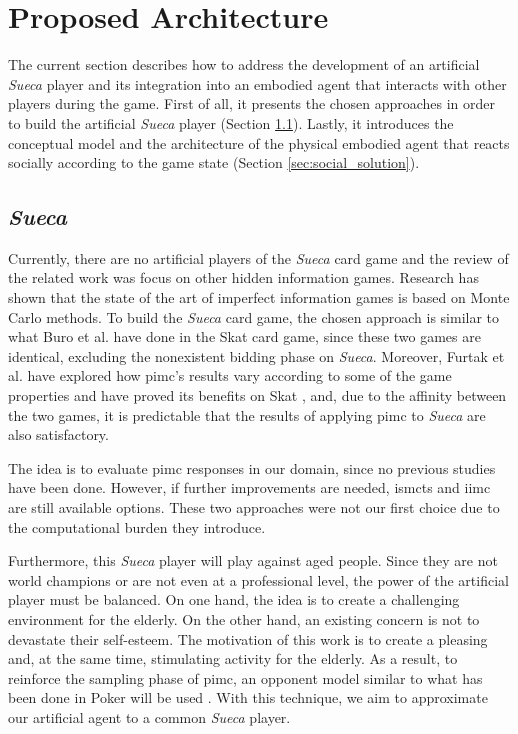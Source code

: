 \section{Proposed Architecture} \label{sec:architecture}

The current section describes how to address the development of an artificial \emph{Sueca} player and its integration into an embodied agent that interacts with other players during the game.
First of all, it presents the chosen approaches in order to build the artificial \emph{Sueca} player (Section \ref{sec:sueca_solution}).
Lastly, it introduces the conceptual model and the architecture of the physical embodied agent that reacts socially according to the game state (Section \ref{sec:social_solution}).


\subsection{\emph{Sueca}}
\label{sec:sueca_solution}

Currently, there are no artificial players of the \emph{Sueca} card game and the review of the related work was focus on other hidden information games.
Research has shown that the state of the art of imperfect information games is based on Monte Carlo methods.
To build the \emph{Sueca} card game, the chosen approach is similar to what Buro et al. have done in the Skat card game, since these two games are identical, excluding the nonexistent bidding phase on \emph{Sueca}.
Moreover, Furtak et al. have explored how \gls{pimc}'s results vary according to some of the game properties and have proved its benefits on Skat \cite{Long2010}, and, due to the affinity between the two games, it is predictable that the results of applying \gls{pimc} to \emph{Sueca} are also satisfactory.


The idea is to evaluate \gls{pimc} responses in our domain, since no previous studies have been done.
However, if further improvements are needed, \gls{ismcts} and \gls{iimc} are still available options.
These two approaches were not our first choice due to the computational burden they introduce.


Furthermore, this \emph{Sueca} player will play against aged people.
Since they are not world champions or are not even at a professional level, the power of the artificial player must be balanced.
On one hand, the idea is to create a challenging environment for the elderly.
On the other hand, an existing concern is not to devastate their self-esteem.
The motivation of this work is to create a pleasing and, at the same time, stimulating activity for the elderly.
As a result, to reinforce the sampling phase of \gls{pimc}, an opponent model similar to what has been done in Poker will be used \cite{Ponsen2008}.
With this technique, we aim to approximate our artificial agent to a common \emph{Sueca} player.


